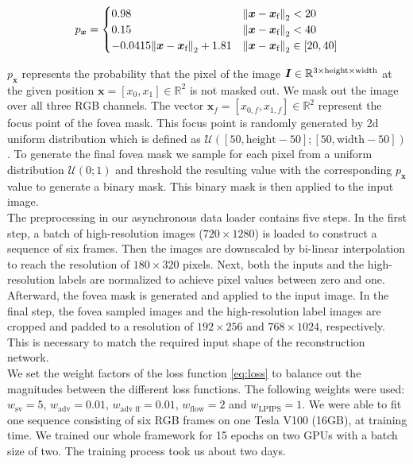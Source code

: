 \documentclass[10pt,twocolumn,letterpaper]{article}
\newcommand{\Vector}[1]{\boldsymbol{#1}}
\newcommand{\Matrix}[1]{\boldsymbol{\MakeUppercase{#1}}}
\newcommand{\Set}[1]{\mathbb{#1}}
\begin{document}
	\begin{equation}
		p_{\Vector{x}} = \begin{cases} 0.98 & \norm{\Vector{x} - \Vector{x}_{\text{f}}}_{2} < 20\\
		0.15 & \norm{\Vector{x} - \Vector{x}_{\text{f}}}_{2} < 40\\
		-0.0415 \norm{\Vector{x} - \Vector{x}_{\text{f}}}_{2} + 1.81 & \norm{\Vector{x} - \Vector{x}_{\text{f}}}_{2} \in \left[20, 40\right]
		\end{cases}
	\end{equation}
	
	$p_{\Vector{x}}$ represents the probability that the pixel of the image $\Matrix{I}\in\Set{R}^{3\times\text{height}\times\text{width}}$ at the given position $\Vector{x}=[x_{0}, x_{1}]\in\Set{R}^2$ is not masked out. We mask out the image over all three RGB channels. The vector $\Vector{x}_{f}=[x_{0,f}, x_{1,f}]\in\Set{R}^2$ represent the focus point of the fovea mask. This focus point is randomly generated by 2d uniform distribution which is defined as $\mathcal{U}\left(\left[50, \text{height} - 50\right]; \left[50, \text{width} - 50\right]\right)$. To generate the final fovea mask we sample for each pixel from a uniform distribution $\mathcal{U}\left(0; 1\right)$ and threshold the resulting value with the corresponding $p_{\Vector{x}}$ value to generate a binary mask. This binary mask is then applied to the input image.\\
	The preprocessing in our asynchronous data loader contains five steps. In the first step, a batch of high-resolution images ($720 \times 1280$) is loaded to construct a sequence of six frames. Then the images are downscaled by bi-linear interpolation to reach the resolution of $180 \times 320$ pixels. Next, both the inputs and the high-resolution labels are normalized to achieve pixel values between zero and one. Afterward, the fovea mask is generated and applied to the input image. In the final step, the fovea sampled images and the high-resolution label images are cropped and padded to a resolution of $192 \times 256$ and $768 \times 1024$, respectively. This is necessary to match the required input shape of the reconstruction network.\\
	We set the weight factors of the loss function \ref{eq:loss} to balance out the magnitudes between the different loss functions. The following weights were used: $w_{\text{sv}}=5$, $w_{\text{adv}}=0.01$, $w_{\text{adv ff}}=0.01$, $w_{\text{flow}}=2$ and $w_{\text{LPIPS}}=1$.
	We were able to fit one sequence consisting of six RGB frames on one Tesla V100 (16GB), at training time. We trained our whole framework for 15 epochs on two GPUs with a batch size of two. The training process took us about two days.
	
\end{document}
